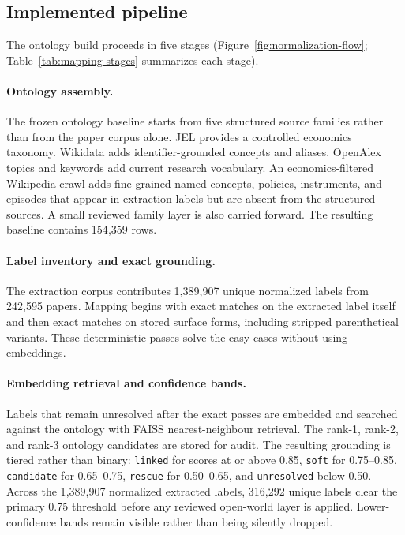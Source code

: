 \documentclass[11pt]{article}
\begin{document}
\subsection{Implemented pipeline}

The ontology build proceeds in five stages (Figure~\ref{fig:normalization-flow};
Table~\ref{tab:mapping-stages} summarizes each stage).

\paragraph{Ontology assembly.} The frozen ontology baseline starts from five structured
source families rather than from the paper corpus alone. JEL provides a controlled
economics taxonomy. Wikidata adds identifier-grounded concepts and aliases. OpenAlex topics
and keywords add current research vocabulary. An economics-filtered Wikipedia crawl adds
fine-grained named concepts, policies, instruments, and episodes that appear in extraction
labels but are absent from the structured sources. A small reviewed family layer is also
carried forward. The resulting baseline contains 154{,}359 rows.

\paragraph{Label inventory and exact grounding.} The extraction corpus contributes
1{,}389{,}907 unique normalized labels from 242{,}595 papers. Mapping begins with exact
matches on the extracted label itself and then exact matches on stored surface forms,
including stripped parenthetical variants. These deterministic passes solve the easy cases
without using embeddings.

\paragraph{Embedding retrieval and confidence bands.} Labels that remain unresolved after
the exact passes are embedded and searched against the ontology with FAISS nearest-neighbour
retrieval. The rank-1, rank-2, and rank-3 ontology candidates are stored for audit. The
resulting grounding is tiered rather than binary: \texttt{linked} for scores at or above
0.85, \texttt{soft} for 0.75--0.85, \texttt{candidate} for 0.65--0.75,
\texttt{rescue} for 0.50--0.65, and \texttt{unresolved} below 0.50. Across the
1{,}389{,}907 normalized extracted labels, 316{,}292 unique labels clear the primary 0.75
threshold before any reviewed open-world layer is applied. Lower-confidence bands remain
visible rather than being silently dropped.
\end{document}
